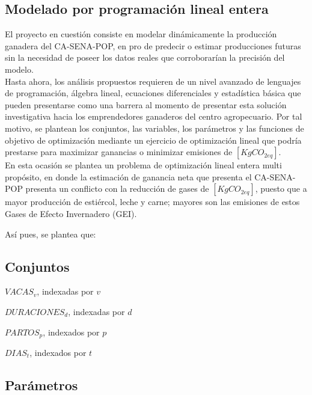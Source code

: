 \subsection{Modelado por programación lineal entera} \label{linprogmod}
El proyecto en cuestión consiste en modelar dinámicamente la producción ganadera del CA-SENA-POP, en pro de predecir o estimar producciones futuras sin la necesidad de poseer los datos reales que corroborarían la precisión del modelo.\\

Hasta ahora, los análisis propuestos requieren de un nivel avanzado de lenguajes de programación, álgebra lineal, ecuaciones diferenciales y estadística básica que pueden presentarse como una barrera al momento de presentar esta solución investigativa hacia los emprendedores ganaderos del centro agropecuario. Por tal motivo, se plantean los conjuntos, las variables, los parámetros y las funciones de objetivo de optimización mediante un ejercicio de optimización lineal que podría prestarse para maximizar ganancias o minimizar emisiones de $[KgCO_{2eq}]$. \\

En esta ocasión se plantea un problema de optimización lineal entera multi propósito, en donde la estimación de ganancia neta que presenta el CA-SENA-POP presenta un conflicto con la reducción de gases de $[KgCO_{2eq}]$, puesto que a mayor producción de estiércol, leche y carne; mayores son las emisiones de estos Gases de Efecto Invernadero (GEI).

Así pues, se plantea que:

\subsection{Conjuntos}
\begin{itemize}
\begin{multicols}{2}
    \item $VACAS_{v}$, indexadas por $v$
    \item $DURACIONES_{d}$, indexadas por $d$
    \item $PARTOS_{p}$, indexados por $p$
    \item $DIAS_{t}$, indexados por $t$
\end{multicols}
\end{itemize}
\subsection{Parámetros}

